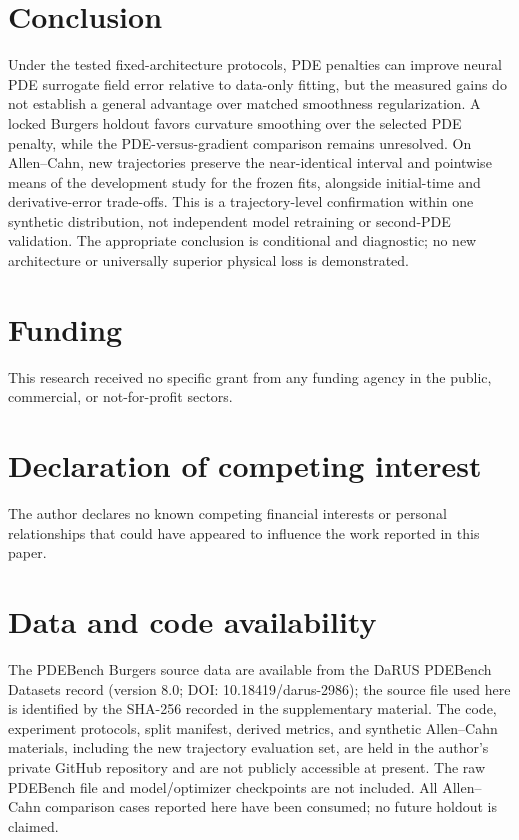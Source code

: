 \documentclass[a4paper,fleqn]{cas-sc}
\begin{document}
\section{Conclusion}
Under the tested fixed-architecture protocols, PDE penalties can improve neural PDE surrogate field error relative to data-only fitting, but the measured gains do not establish a general advantage over matched smoothness regularization. A locked Burgers holdout favors curvature smoothing over the selected PDE penalty, while the PDE-versus-gradient comparison remains unresolved. On Allen--Cahn, new trajectories preserve the near-identical interval and pointwise means of the development study for the frozen fits, alongside initial-time and derivative-error trade-offs. This is a trajectory-level confirmation within one synthetic distribution, not independent model retraining or second-PDE validation. The appropriate conclusion is conditional and diagnostic; no new architecture or universally superior physical loss is demonstrated.

\printcredits

\section*{Funding}
This research received no specific grant from any funding agency in the public, commercial, or not-for-profit sectors.

\section*{Declaration of competing interest}
The author declares no known competing financial interests or personal relationships that could have appeared to influence the work reported in this paper.

\section*{Data and code availability}
The PDEBench Burgers source data are available from the DaRUS PDEBench Datasets record (version 8.0; DOI: 10.18419/darus-2986)\citep{pdebench_dataset}; the source file used here is identified by the SHA-256 recorded in the supplementary material. The code, experiment protocols, split manifest, derived metrics, and synthetic Allen--Cahn materials, including the new trajectory evaluation set, are held in the author's private GitHub repository and are not publicly accessible at present. The raw PDEBench file and model/optimizer checkpoints are not included. All Allen--Cahn comparison cases reported here have been consumed; no future holdout is claimed.
\end{document}
